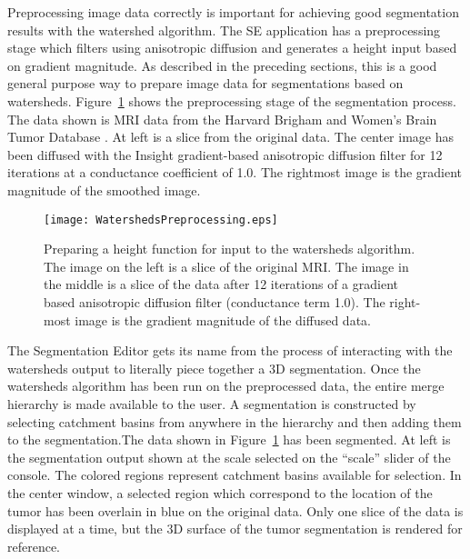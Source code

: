 Preprocessing image data correctly is important for achieving good segmentation
results with the watershed algorithm.  The SE application has a preprocessing
stage which filters using anisotropic diffusion and generates a height input
based on gradient magnitude.  As described in the preceding sections, this is a
good general purpose way to prepare image data for segmentations based on watersheds.
Figure~\ref{fig:preprocessWatersheds} shows the preprocessing stage of the
segmentation process.  The data shown is MRI data from the Harvard
Brigham and Women's Brain Tumor Database \cite{Kaus2001,Warfield2000b}.  At
left is a slice from the original data.  The center image has been diffused
with the Insight gradient-based anisotropic diffusion filter for 12 iterations
at a conductance coefficient of 1.0.  The rightmost image is the gradient
magnitude of the smoothed image.

\begin{figure}
\centering
\texttt{[image: WatershedsPreprocessing.eps]}
\caption{Preparing a height function for input to the watersheds algorithm.
The image on the left is a slice of the original MRI.  The image in the middle
is a slice of the data after 12 iterations of a gradient based anisotropic
diffusion filter (conductance term 1.0).  The right-most image is the gradient
magnitude of the diffused data.}
\protect\label{fig:preprocessWatersheds}
\end{figure}



The Segmentation Editor gets its name from the process of interacting with the
watersheds output to literally piece together a 3D segmentation.  Once the
watersheds algorithm has been run on the preprocessed data, the entire merge
hierarchy is made available to the user.  A segmentation is constructed by
selecting catchment basins from anywhere in the hierarchy and then adding them
to the segmentation.The data shown in Figure~\ref{fig:preprocessWatersheds} has been
segmented.  At left is the segmentation output shown at the scale selected on
the ``scale'' slider of the console.  The colored regions represent catchment
basins available for selection.  In the center window, a selected region which
correspond to the location of the tumor has been overlain in blue on the
original data.  Only one slice of the data is displayed at a time, but the
3D surface of the tumor segmentation is rendered for reference.


